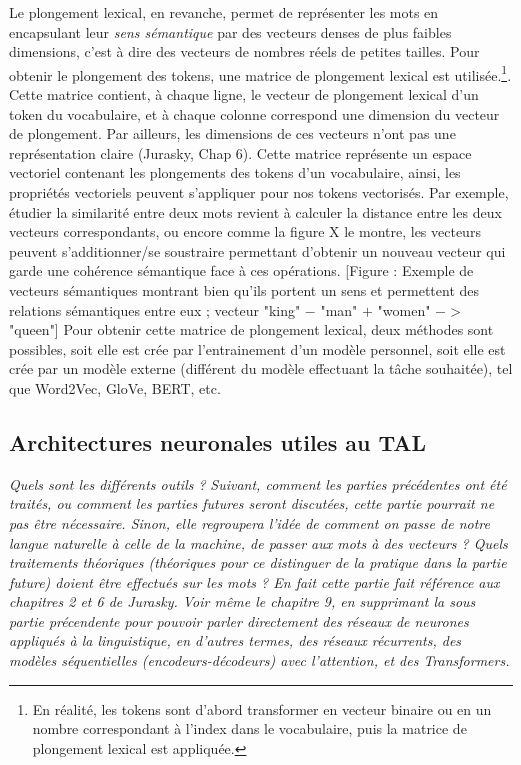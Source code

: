 \documentclass[12pt, french, twoside]{report}
\begin{document}
Le plongement lexical, en revanche, permet de représenter les mots en encapsulant leur \textit{sens sémantique} par des vecteurs denses de plus faibles dimensions, c'est à dire des vecteurs de nombres réels de petites tailles. Pour obtenir le plongement des tokens, une matrice de plongement lexical est utilisée.\footnote{En réalité, les tokens sont d'abord transformer en vecteur binaire ou en un nombre correspondant à l'index dans le vocabulaire, puis la matrice de plongement lexical est appliquée.}. Cette matrice contient, à chaque ligne, le vecteur de plongement lexical d'un token du vocabulaire, et à chaque colonne correspond une dimension du vecteur de plongement. Par ailleurs, les dimensions de ces vecteurs n'ont pas une représentation claire (Jurasky, Chap 6)\cite{jurafsky_vector}. Cette matrice représente un espace vectoriel contenant les plongements des tokens d'un vocabulaire, ainsi, les propriétés vectoriels peuvent s'appliquer pour nos tokens vectorisés. Par exemple, étudier la similarité entre deux mots revient à calculer la distance entre les deux vecteurs correspondants, ou encore comme la figure X le montre, les vecteurs peuvent s'additionner/se soustraire permettant d'obtenir un nouveau vecteur qui garde une cohérence sémantique face à ces opérations. [Figure : Exemple de vecteurs sémantiques montrant bien qu'ils portent un sens et permettent des relations sémantiques entre eux ; vecteur "king" $-$ "man" $+$ "women" $->$ "queen"] Pour obtenir cette matrice de plongement lexical, deux méthodes sont possibles, soit elle est crée par l'entrainement d'un modèle personnel, soit elle est crée par un modèle externe (différent du modèle effectuant la tâche souhaitée), tel que Word2Vec, GloVe, BERT, etc.


\subsection{Architectures neuronales utiles au TAL}
\textit{Quels sont les différents outils ?}
\textit{Suivant, comment les parties précédentes ont été traités, ou comment les parties futures seront discutées, cette partie pourrait ne pas être nécessaire. Sinon, elle regroupera l'idée de comment on passe de notre langue naturelle à celle de la machine, de passer aux mots à des vecteurs ? Quels traitements théoriques (théoriques pour ce distinguer de la pratique dans la partie future) doient être effectués sur les mots ? En fait cette partie fait référence aux chapitres 2 et 6 de Jurasky. Voir même le chapitre 9, en supprimant la sous partie précendente pour pouvoir parler directement des réseaux de neurones appliqués à la linguistique, en d'autres termes, des réseaux récurrents, des modèles séquentielles (encodeurs-décodeurs) avec l'attention, et des Transformers.}\\
\end{document}

